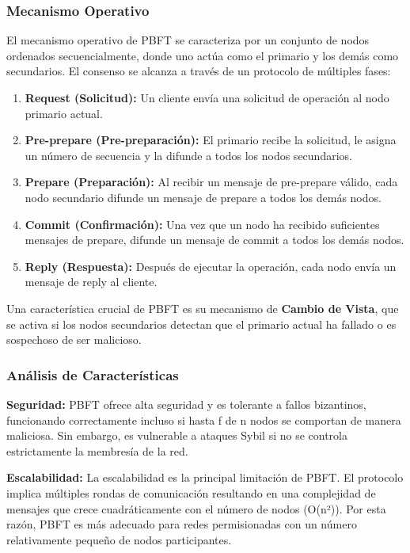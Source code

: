 \documentclass[spanish,12pt,letterpaper]{report}
\begin{document}
\subsubsection{Mecanismo Operativo}

El mecanismo operativo de PBFT se caracteriza por un conjunto de nodos ordenados secuencialmente, donde uno actúa como el primario y los demás como secundarios. El consenso se alcanza a través de un protocolo de múltiples fases:

\begin{enumerate}
    \item \textbf{Request (Solicitud):} Un cliente envía una solicitud de operación al nodo primario actual.
    \item \textbf{Pre-prepare (Pre-preparación):} El primario recibe la solicitud, le asigna un número de secuencia y la difunde a todos los nodos secundarios.
    \item \textbf{Prepare (Preparación):} Al recibir un mensaje de pre-prepare válido, cada nodo secundario difunde un mensaje de prepare a todos los demás nodos.
    \item \textbf{Commit (Confirmación):} Una vez que un nodo ha recibido suficientes mensajes de prepare, difunde un mensaje de commit a todos los demás nodos.
    \item \textbf{Reply (Respuesta):} Después de ejecutar la operación, cada nodo envía un mensaje de reply al cliente.
\end{enumerate}

Una característica crucial de PBFT es su mecanismo de \textbf{Cambio de Vista}, que se activa si los nodos secundarios detectan que el primario actual ha fallado o es sospechoso de ser malicioso.

\subsubsection{Análisis de Características}

\textbf{Seguridad:} PBFT ofrece alta seguridad y es tolerante a fallos bizantinos, funcionando correctamente incluso si hasta f de n nodos se comportan de manera maliciosa. Sin embargo, es vulnerable a ataques Sybil si no se controla estrictamente la membresía de la red.

\textbf{Escalabilidad:} La escalabilidad es la principal limitación de PBFT. El protocolo implica múltiples rondas de comunicación resultando en una complejidad de mensajes que crece cuadráticamente con el número de nodos (O(n²)). Por esta razón, PBFT es más adecuado para redes permisionadas con un número relativamente pequeño de nodos participantes.
\end{document}
